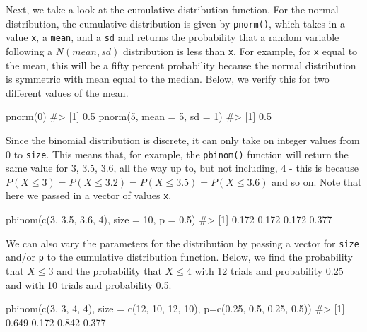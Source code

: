 \documentclass[
  letterpaper,
]{krantz}
\makeatletter
\newenvironment{Shaded}{\begin{snugshade}}{\end{snugshade}}
\newcommand{\AttributeTok}[1]{\textcolor[rgb]{0.40,0.45,0.13}{#1}}
\newcommand{\CommentTok}[1]{\textcolor[rgb]{0.37,0.37,0.37}{#1}}
\newcommand{\DecValTok}[1]{\textcolor[rgb]{0.68,0.00,0.00}{#1}}
\newcommand{\FloatTok}[1]{\textcolor[rgb]{0.68,0.00,0.00}{#1}}
\newcommand{\FunctionTok}[1]{\textcolor[rgb]{0.28,0.35,0.67}{#1}}
\newcommand{\NormalTok}[1]{\textcolor[rgb]{0.00,0.23,0.31}{#1}}
\newenvironment{kframe}{%
\medskip{}
\setlength{\fboxsep}{.8em}
 \def\at@end@of@kframe{}%
 \ifinner\ifhmode%
  \def\at@end@of@kframe{\end{minipage}}%
  \begin{minipage}{\columnwidth}%
 \fi\fi%
 \def\FrameCommand##1{\hskip\@totalleftmargin \hskip-\fboxsep
 \colorbox{shadecolor}{##1}\hskip-\fboxsep
     \hskip-\linewidth \hskip-\@totalleftmargin \hskip\columnwidth}%
 \MakeFramed {\advance\hsize-\width
   \@totalleftmargin\z@ \linewidth\hsize
   \@setminipage}}%
 {\par\unskip\endMakeFramed%
 \at@end@of@kframe}
\renewenvironment{Shaded}{\begin{kframe}}{\end{kframe}}
\makeatother
\begin{document}
Next, we take a look at the cumulative distribution function. For the
normal distribution, the cumulative distribution is given by
\texttt{pnorm()}, which takes in a value \texttt{x}, a \texttt{mean},
and a \texttt{sd} and returns the probability that a random variable
following a \(N(mean, sd)\) distribution is less than \texttt{x}. For
example, for \texttt{x} equal to the mean, this will be a fifty percent
probability because the normal distribution is symmetric with mean equal
to the median. Below, we verify this for two different values of the
mean.

\begin{Shaded}
\begin{Highlighting}[]
\FunctionTok{pnorm}\NormalTok{(}\DecValTok{0}\NormalTok{)}
\CommentTok{\#\textgreater{} [1] 0.5}
\FunctionTok{pnorm}\NormalTok{(}\DecValTok{5}\NormalTok{, }\AttributeTok{mean =} \DecValTok{5}\NormalTok{, }\AttributeTok{sd =} \DecValTok{1}\NormalTok{)}
\CommentTok{\#\textgreater{} [1] 0.5}
\end{Highlighting}
\end{Shaded}

Since the binomial distribution is discrete, it can only take on integer
values from 0 to \texttt{size}. This means that, for example, the
\texttt{pbinom()} function will return the same value for 3, 3.5, 3.6,
all the way up to, but not including, 4 - this is because
\(P(X \leq 3) = P(X \leq 3.2) = P(X \leq 3.5) = P(X \leq 3.6)\) and so
on. Note that here we passed in a vector of values \texttt{x}.

\begin{Shaded}
\begin{Highlighting}[]
\FunctionTok{pbinom}\NormalTok{(}\FunctionTok{c}\NormalTok{(}\DecValTok{3}\NormalTok{, }\FloatTok{3.5}\NormalTok{, }\FloatTok{3.6}\NormalTok{, }\DecValTok{4}\NormalTok{), }\AttributeTok{size =} \DecValTok{10}\NormalTok{, }\AttributeTok{p =} \FloatTok{0.5}\NormalTok{)}
\CommentTok{\#\textgreater{} [1] 0.172 0.172 0.172 0.377}
\end{Highlighting}
\end{Shaded}

We can also vary the parameters for the distribution by passing a vector
for \texttt{size} and/or \texttt{p} to the cumulative distribution
function. Below, we find the probability that \(X \leq 3\) and the
probability that \(X \leq 4\) with 12 trials and probability 0.25 and
with 10 trials and probability 0.5.

\begin{Shaded}
\begin{Highlighting}[]
\FunctionTok{pbinom}\NormalTok{(}\FunctionTok{c}\NormalTok{(}\DecValTok{3}\NormalTok{, }\DecValTok{3}\NormalTok{, }\DecValTok{4}\NormalTok{, }\DecValTok{4}\NormalTok{), }\AttributeTok{size =} \FunctionTok{c}\NormalTok{(}\DecValTok{12}\NormalTok{, }\DecValTok{10}\NormalTok{, }\DecValTok{12}\NormalTok{, }\DecValTok{10}\NormalTok{), }
       \AttributeTok{p=}\FunctionTok{c}\NormalTok{(}\FloatTok{0.25}\NormalTok{, }\FloatTok{0.5}\NormalTok{, }\FloatTok{0.25}\NormalTok{, }\FloatTok{0.5}\NormalTok{))}
\CommentTok{\#\textgreater{} [1] 0.649 0.172 0.842 0.377}
\end{Highlighting}
\end{Shaded}
\end{document}
